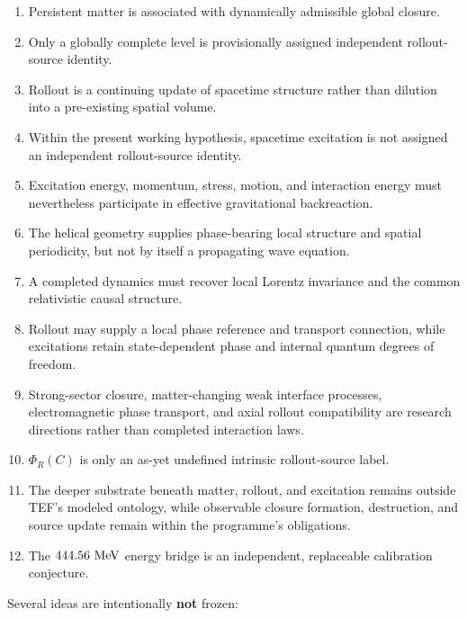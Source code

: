 \documentclass[10pt]{article}
\providecommand{\tightlist}{\setlength{\itemsep}{0pt}\setlength{\parskip}{0pt}}
\begin{document}
\begin{enumerate}
\def\labelenumi{\arabic{enumi}.}
\tightlist
\item
  Persistent matter is associated with dynamically admissible global closure.
\item
  Only a globally complete level is provisionally assigned independent rollout-source identity.
\item
  Rollout is a continuing update of spacetime structure rather than dilution into a pre-existing spatial volume.
\item
  Within the present working hypothesis, spacetime excitation is not assigned an independent rollout-source identity.
\item
  Excitation energy, momentum, stress, motion, and interaction energy must nevertheless participate in effective gravitational backreaction.
\item
  The helical geometry supplies phase-bearing local structure and spatial periodicity, but not by itself a propagating wave equation.
\item
  A completed dynamics must recover local Lorentz invariance and the common relativistic causal structure.
\item
  Rollout may supply a local phase reference and transport connection, while excitations retain state-dependent phase and internal quantum degrees of freedom.
\item
  Strong-sector closure, matter-changing weak interface processes, electromagnetic phase transport, and axial rollout compatibility are research directions rather than completed interaction laws.
\item
  \(\Phi_R(C)\) is only an as-yet undefined intrinsic rollout-source label.
\item
  The deeper substrate beneath matter, rollout, and excitation remains outside TEF's modeled ontology, while observable closure formation, destruction, and source update remain within the programme's obligations.
\item
  The \(444.56\ {\rm MeV}\) energy bridge is an independent, replaceable calibration conjecture.
\end{enumerate}

Several ideas are intentionally \textbf{not} frozen:
\end{document}
